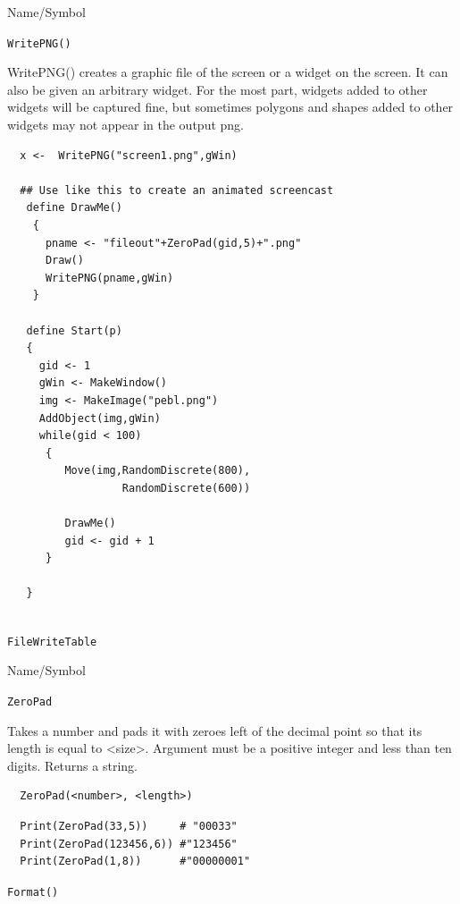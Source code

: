 \begin{desc}{Name/Symbol}
\item[Name/Symbol]	\verb+WritePNG()+

\item[Description] WritePNG() creates a graphic file of the screen or
  a widget on the screen.  It can also be given an arbitrary widget.
  For the most part, widgets added to other widgets will be captured
  fine, but sometimes polygons and shapes added to other widgets may
  not appear in the output png.

\item[Usage]

\begin{verbatim}
  x <-  WritePNG("screen1.png",gWin)

  ## Use like this to create an animated screencast
   define DrawMe()
    {
      pname <- "fileout"+ZeroPad(gid,5)+".png"
      Draw()
      WritePNG(pname,gWin)
    }
  
   define Start(p)  
   {
     gid <- 1
     gWin <- MakeWindow()
     img <- MakeImage("pebl.png")
     AddObject(img,gWin)
     while(gid < 100)
      {
         Move(img,RandomDiscrete(800),
                  RandomDiscrete(600))
 
         DrawMe()
         gid <- gid + 1
      }

   }   
  
\end{verbatim}
\item[See Also]	\verb+FileWriteTable+
\end{desc}

\vfill
\newpage

\vfill


\begin{desc}{Name/Symbol}
\item[Name/Symbol]	\verb+ZeroPad+

\item[Description]  Takes a number and pads it with zeroes left of the
  decimal point so that its length is equal to <size>. Argument must
  be a positive integer and less than ten digits.  Returns a string.


\item[Usage]
\begin{verbatim}
  ZeroPad(<number>, <length>)
\end{verbatim}

\item[Example] 
\begin{verbatim}
  Print(ZeroPad(33,5))     # "00033"
  Print(ZeroPad(123456,6)) #"123456"
  Print(ZeroPad(1,8))      #"00000001"
\end{verbatim}

\item[See Also] \verb+Format()+
\end{desc}



